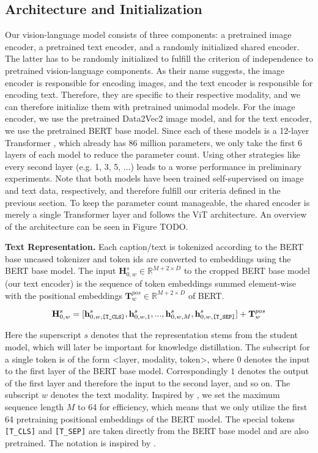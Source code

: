 \documentclass[10pt]{article} %
\begin{document}
\subsection{Architecture and Initialization}
Our vision-language model consists of three components: a pretrained image encoder, a pretrained text encoder, and a randomly initialized
shared encoder.
The latter has to be randomly initialized to fulfill the criterion of independence to pretrained vision-language components.
As their name suggests, the image encoder is responsible for encoding images, and the text encoder is responsible for encoding text.
Therefore, they are specific to their respective modality, and we can therefore initialize them with pretrained unimodal models.
For the image encoder, we use the pretrained Data2Vec2 \citep{data2vec2} image model, and for the text encoder, we use the pretrained
BERT base \citep{bert} model. Since each of these models is a 12-layer Transformer \citep{transformer}, which already has 86 million
parameters, we only take the first 6 layers of each model to reduce the parameter count. Using other strategies like every second layer
(e.g. 1, 3, 5, ...) leads to a worse performance in preliminary experiments. Note that both models have been trained self-supervised on
image and text data, respectively, and therefore fulfill our criteria defined in the previous section. To keep the parameter count manageable,
the shared encoder is merely a single Transformer layer and follows the ViT \citep{vit} architecture. An overview of the architecture can
be seen in Figure TODO.

\textbf{Text Representation.} Each caption/text is tokenized according to the BERT base uncased tokenizer \citep{bert} and token ids are converted
to embeddings using the BERT base model. The input $\textbf{H}^{s}_{0, w} \in \mathbb{R}^{M+2\times D}$ to the
cropped BERT base model (our text encoder) is the sequence
of token embeddings summed element-wise with the positional embeddings $\textbf{T}^{pos}_{w} \in \mathbb{R}^{M+2\times D}$ of BERT.

\[
\textbf{H}^{s}_{0, w} = [\textbf{h}^{s}_{0, w, \text{\texttt{[T\_CLS]}}}, \textbf{h}^{s}_{0, w, 1}, ..., \textbf{h}^{s}_{0, w, M}, \textbf{h}^{s}_{0, w, \text{\texttt{[T\_SEP]}}}] + \textbf{T}^{pos}_{w}
\]

Here the superscript $s$ denotes that the representation stems from the student model, which will later be important for knowledge distillation.
The subscript for a single token is of the form <layer, modality, token>, where $0$ denotes the input to the first layer of the BERT base model.
Correspondingly $1$ denotes the output of the first layer and
therefore the input to the second layer, and so on. The subscript $w$ denotes the text modality.
Inspired by \citet{beit3}, we set the maximum sequence length $M$ to 64 for efficiency, which means that we
only utilize the first 64 pretraining positional embeddings of the BERT model. The special tokens \texttt{[T\_CLS]} and \texttt{[T\_SEP]}
are taken directly from the BERT base model and are also pretrained. 
The notation is inspired by \citet{vlmo}.
\end{document}
